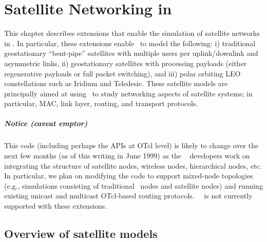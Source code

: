 %
\chapter{Satellite Networking in \ns}
\label{chap:satellite}

This chapter describes extensions that enable the simulation of satellite
networks in \ns.  In particular, these extensions enable \ns~to model
the following:  i) traditional geostationary ``bent-pipe'' satellites with 
multiple users per uplink/downlink and asymmetric links, ii) geostationary 
satellites with processing payloads (either regenerative payloads or full 
packet switching), and iii) polar orbiting LEO constellations such as 
Iridium and Teledesic.  These satellite models are principally aimed at 
using \ns~to study networking aspects of satellite systems; in particular, 
MAC, link layer, routing, and transport protocols.  

\paragraph{Notice (caveat emptor)} 

This code (including perhaps the APIs at OTcl level) is likely to change 
over the next few months (as of this writing in June 1999) as the \ns~
developers work on integrating the structure of satellite nodes, 
wireless nodes, hierarchical nodes, etc.  In particular, we plan on
modifying the code to support mixed-node topologies (e.g., simulations
consisting of traditional \ns~nodes and satellite nodes) and running existing 
unicast and multicast OTcl-based routing protocols.  \nam~~is 
not currently supported with these extensions.


\section{Overview of satellite models}
\label{sec:satellite/overview}

